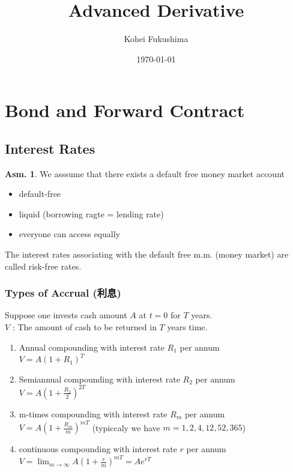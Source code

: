 \documentclass[a4paper,11pt]{jsarticle}
\title{Advanced Derivative}
\author{Kohei Fukushima}
\date{\today}
\theoremstyle{definition}
\newtheorem{asm}{Asm.}[subsection]
\begin{document}
\maketitle
\pagestyle{fancy}
\rhead{\rightmark}




\section{Bond and Forward Contract}
\subsection{Interest Rates}
\begin{asm}
  We asssume that there exists a default free
  money market account
  \begin{itemize}
    \item default-free
    \item liquid (borrowing ragte = lending rate)
    \item everyone can access equally
  \end{itemize}
\end{asm}

The interest rates associating with the default free m.m.
(money market) are called risk-free rates.


\subsubsection{Types of Accrual (利息)}
Suppose one invests cash amount $A$ at $t=0$ for $T$ years. \\
$V$ : The amount of cash to be returned in $T$ years time.

\begin{enumerate}
  \item Annual compounding with interest rate $R_1$ per annum\\
  $V=A(1+R_1)^T$
  \item Semiannual compounding with interest rate $R_2$ per annum\\
  $V=A(1+\frac{R_2}{2})^{2T}$
  \item m-times compounding with interest rate $R_m$ per annum\\
  $V=A(1+\frac{R_m}{m})^{mT}$
  \quad (typiccaly we have $m=1,2,4,12,52,365$)
  \item continuous compounding with interest rate $r$ per annum\\
  $V=\lim_{m\to\infty}A(1+\frac{r}{m})^{mT}=Ae^{rT}$  
\end{enumerate}
\end{document}
